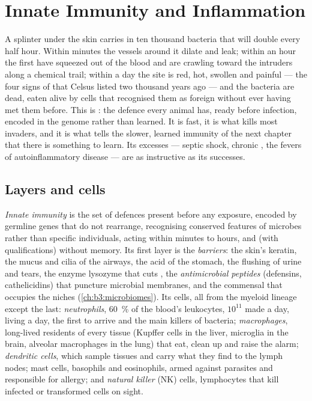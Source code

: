 \chapter{Innate Immunity and Inflammation}\label{ch:b3:innate-immunity}

A splinter under the skin carries in ten thousand bacteria that will
double every half hour. Within minutes the vessels around it dilate and
leak; within an hour the first  have squeezed out of the
blood and are crawling toward the intruders along a chemical trail;
within a day the site is red, hot, swollen and painful --- the four
signs of  that Celsus listed two thousand years ago --- and
the bacteria are dead, eaten alive by cells that recognised them as
foreign without ever having met them before. This is :
the defence every animal has, ready before infection, encoded in the
genome rather than learned. It is fast, it is what kills most invaders,
and it is what tells the slower, learned immunity of the next chapter
that there is something to learn. Its excesses --- septic shock, chronic
, the fevers of autoinflammatory disease --- are as
instructive as its successes.

\section{Layers and cells}

\begin{definition}\label{def:b3:innate-immunity:innate}
\emph{Innate immunity} is the set of defences present before any
exposure, encoded by germline genes that do not rearrange, recognising
conserved features of microbes rather than specific individuals, acting
within minutes to hours, and (with qualifications) without memory. Its
first layer is the \emph{barriers}: the skin's keratin, the mucus and
cilia of the airways, the acid of the stomach, the flushing of urine
and tears, the enzyme lysozyme that cuts , the
\emph{antimicrobial peptides} (defensins, cathelicidins) that puncture
microbial membranes, and the commensal  that occupies the
niches (\cref{ch:b3:microbiomes}). Its cells, all from the myeloid
lineage except the last: \emph{neutrophils}, \qty{60}{\%} of the blood's
leukocytes, $10^{11}$ made a day, living a day, the first to arrive and
the main killers of bacteria; \emph{macrophages}, long-lived residents
of every tissue (Kupffer cells in the liver, microglia in the brain,
alveolar macrophages in the lung) that eat, clean up and raise the
alarm; \emph{dendritic cells}, which sample tissues and carry what they
find to the lymph nodes; mast cells, basophils and eosinophils, armed
against parasites and responsible for allergy; and \emph{natural killer}
(NK) cells, lymphocytes that kill infected or transformed cells on
sight.
\end{definition}

